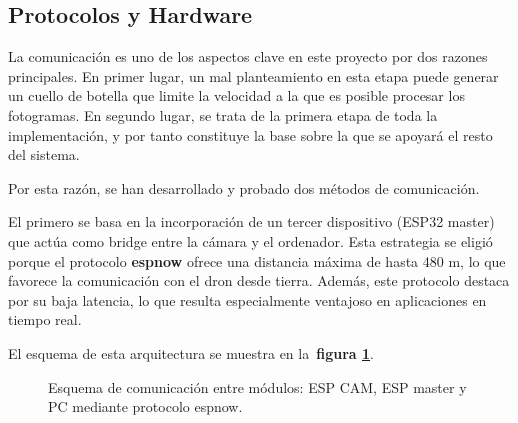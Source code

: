       \subsection{Protocolos y Hardware}
La comunicación es uno de los aspectos clave en este proyecto por dos razones principales. En primer lugar, un mal planteamiento en esta etapa puede generar un cuello de botella que limite la velocidad a la que es posible procesar los fotogramas. En segundo lugar, se trata de la primera etapa de toda la implementación, y por tanto constituye la base sobre la que se apoyará el resto del sistema.

Por esta razón, se han desarrollado y probado dos métodos de comunicación.

El primero se basa en la incorporación de un tercer dispositivo (ESP32 master) que actúa como bridge entre la cámara y el ordenador. Esta estrategia se eligió porque el protocolo \textbf{espnow} ofrece una distancia máxima de hasta 480 m, lo que favorece la comunicación con el dron desde tierra. Además, este protocolo destaca por su baja latencia, lo que resulta especialmente ventajoso en aplicaciones en tiempo real.

El esquema de esta arquitectura se muestra en la~\textbf{figura \ref{fig:comms_esquema_espnow}}.

\vspace{1cm}
\begin{figure}[H] %
    \centering
    \caption{Esquema de comunicación entre módulos: ESP CAM, ESP master y PC mediante protocolo espnow.}
    \label{fig:comms_esquema_espnow}
\end{figure}


